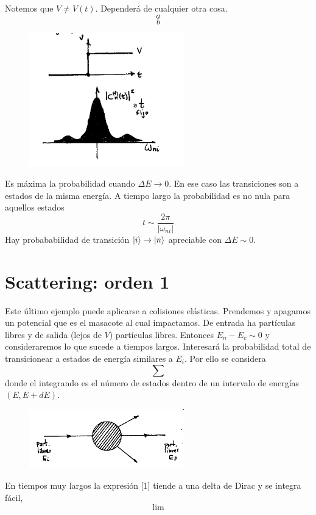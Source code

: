 \documentclass[10pt,oneside]{CBFT_book}
\begin{document}
Notemos que $V\neq V(t)$. Dependerá de cualquier otra cosa.
\[
	a
\]
\[
	b
\]
\begin{figure}[htb]
	\begin{center}
	\includegraphics[width=0.6\textwidth]{images/teo2_22.pdf}
	\end{center}
	\caption{}
\end{figure} 
Es máxima la probabilidad cuando $\Delta E\to 0$. En ese caso las transiciones son a estados de la misma 
energía. A tiempo largo la probabilidad es no nula para aquellos estados 
\[
	t \sim \frac{2\pi}{|\omega_{ni}|}
\]
Hay probababilidad de transición $\Ket{i} \to \Ket{n}$ apreciable con $\Delta E \sim 0$.

\section{Scattering: orden 1}

Este último ejemplo puede aplicarse a colisiones elásticas. Prendemos y apagamos un potencial que es el 
masacote al cual impactamos. De entrada ha partículas libres y de salida (lejos de $V$) partículas libres.
Entonces $ E_n - E_c \sim 0$ y consideraremos lo que sucede a tiempos largos. Interesará la probabilidad 
total de transicionear a estados de energía similares a $E_i$. Por ello se considera 
\[
	\sum 
\]
donde el integrando es el número de estados dentro de un intervalo de energías $(E,E+dE)$.
\begin{figure}[htb]
	\begin{center}
	\includegraphics[width=0.6\textwidth]{images/teo2_23.pdf}
	\end{center}
	\caption{}
\end{figure} 
En tiempos muy largos la expresión [1] tiende a una delta de Dirac y se integra fácil,
\[
	\lim 
\]
\end{document}
